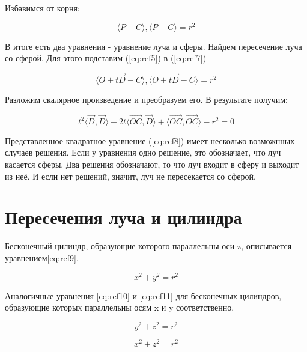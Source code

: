 Избавимся от корня:

\begin{equation}
	\langle P - C\rangle, \langle P - C\rangle = r^2
	\label{eq:ref7}
\end{equation}

В итоге есть два уравнения - уравнение луча и сферы. Найдем пересечение луча со сферой. Для этого подставим (\ref{eq:ref5}) в (\ref{eq:ref7})

\begin{equation}
	\langle O + t\overrightarrow{D} - C \rangle, \langle O + t\overrightarrow{D} - C\rangle = r^2
\end{equation}

Разложим скалярное произведение и преобразуем его. В результате получим:

\begin{equation}
	t^2 \langle \overrightarrow{D}, \overrightarrow{D} \rangle + 2t \langle \overrightarrow{OC}, \overrightarrow{D} \rangle + \langle \overrightarrow{OC}, \overrightarrow{OC} \rangle -r^2 = 0
	\label{eq:ref8}
\end{equation}

Представленное квадратное уравнение (\ref{eq:ref8}) имеет несколько возможнных случаев решения.
Если у уравнения одно решение, это обозначает, что луч касается сферы.
Два решения обозначают, то что луч входит в сферу и выходит из неё.
И если нет решений, значит, луч не пересекается со сферой.

\section{Пересечения луча и цилиндра}
Бесконечный цилиндр, образующие которого параллельны оси z, описывается уравнением\eqref{eq:ref9}.

\begin{equation}
	x^2 + y^2 = r^2
	\label{eq:ref9}
\end{equation}

Аналогичные уравнения \eqref{eq:ref10} и \eqref{eq:ref11} для
бесконечных цилиндров, образующие которых параллельны осям x и y соответственно.

\begin{equation}
	y^2 + z^2 = r^2
	\label{eq:ref10}
\end{equation}

\begin{equation}
	x^2 + z^2 = r^2
	\label{eq:ref11}
\end{equation}

